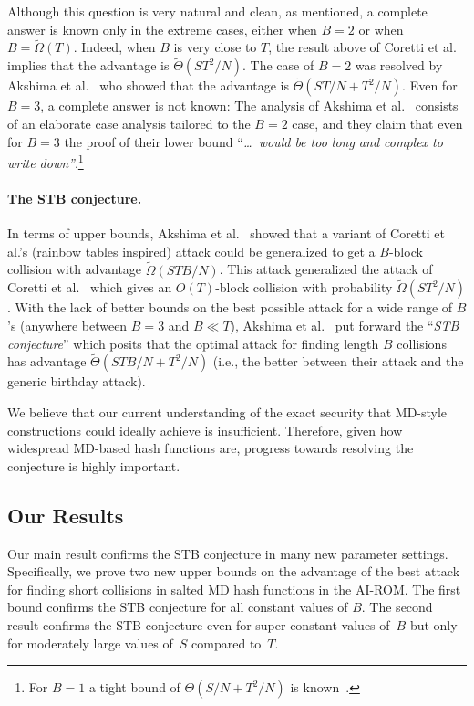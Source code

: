 Although this question is very natural and clean, as mentioned, a complete answer is known only in the extreme cases, either when $B=2$ or when $B=\tilde \Omega(T)$.  Indeed, when $B$ is very close to $T$, the result above of Coretti et al.~\cite{CorettiDGS18} implies that the advantage is  $\tilde\Theta(ST^2/N)$. The case of $B=2$ was resolved by Akshima et al.~\cite{AkshimaCDW20} who showed that the advantage is $\tilde\Theta(ST/N + T^2/N)$. Even for $B=3$, a complete answer is not known: The analysis of Akshima et al.~\cite{AkshimaCDW20} consists of an elaborate case analysis tailored to the $B=2$ case, and they claim that even for $B=3$ the proof of their lower bound ``{\it …\ would be too long and complex to write down''}.\footnote{For $B=1$ a tight bound of $\Theta(S/N+T^2/N)$ is known~\cite{DodisGK17}.}

\paragraph{The STB conjecture.}  In terms of upper bounds, Akshima et al.~\cite{AkshimaCDW20} showed that a variant of  Coretti et al.'s (rainbow tables inspired) attack could be generalized to get a $B$-block collision with advantage $\tilde \Omega( STB / N)$. This attack generalized the attack of Coretti et al.~\cite{CorettiDGS18} which gives an $O(T)$-block collision with probability $\tilde \Omega(ST^2/N)$. 
With the lack of better bounds on the best possible attack for a wide range of $B$'s (anywhere between $B=3$ and $B\ll T$),  Akshima et al.~\cite{AkshimaCDW20} put forward the ``\emph{STB conjecture}'' which posits that the optimal attack for finding length $B$ collisions has advantage $\tilde \Theta(STB/N + T^2/N)$ (i.e., the better between their attack and the generic birthday attack).

We believe that our current understanding of the exact security that MD-style constructions could ideally achieve is insufficient. Therefore, given how widespread MD-based hash functions are, progress towards resolving the conjecture is highly important.

\subsection{Our Results}
Our main result confirms the STB conjecture in many new parameter settings. Specifically, we prove two new upper bounds on the advantage of the best attack for finding short collisions in salted MD hash functions in the AI-ROM. The first bound confirms the STB conjecture for all constant values of $B$. The second result confirms the STB conjecture even for super constant values of~$B$ but only for moderately large values of~$S$ compared to~$T$.



